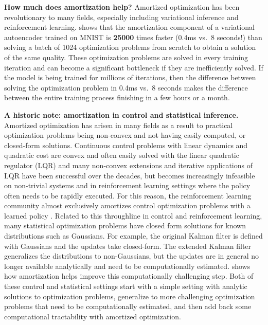 \textbf{How much does amortization help?}
Amortized optimization has been revolutionary to many fields,
especially including variational inference and reinforcement
learning.
 shows that the amortization component
of a variational autoencoder trained on MNIST is \textbf{25000}
times faster (0.4ms vs.~8 seconds!) than solving a batch of
1024 optimization problems from scratch to obtain a
solution of the same quality.
These optimization problems are solved in every training iteration
and can become a significant bottleneck if they are
inefficiently solved.
If the model is being trained for millions of iterations,
then the difference between solving the optimization problem
in 0.4ms vs.~8 seconds makes the difference between the
entire training process finishing in a few hours or a month.

\textbf{A historic note: amortization in control and statistical inference.}
Amortized optimization has arisen in many fields as a result
to practical optimization problems being non-convex and not
having easily computed, or closed-form solutions.
Continuous control problems with linear dynamics and quadratic
cost are convex and often easily solved with the linear
quadratic regulator (LQR) and many non-convex extensions and
iterative applications of LQR have been successful over
the decades, but becomes increasingly infeasible on
non-trivial systems and in reinforcement learning settings
where the policy often needs to be rapidly executed.
For this reason, the reinforcement learning community almost
exclusively amortizes control optimization problems with
a learned policy \citep{sutton2018reinforcement}.
Related to this throughline in control and reinforcement learning,
many statistical optimization problems have closed
form solutions for known distributions such as Gaussians.
For example, the original Kalman filter is defined with Gaussians
and the updates take closed-form. The extended Kalman filter
generalizes the distributions to non-Gaussians, but the updates
are in general no longer available analytically and need to be
computationally estimated.
\citet{marino2018general} shows how amortization helps improve
this computationally challenging step.
Both of these control and statistical settings start with a
simple setting with analytic solutions to optimization problems,
generalize to more challenging optimization problems
that need to be computationally estimated, and then
add back some computational tractability with amortized optimization.


